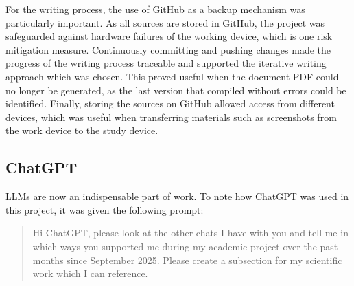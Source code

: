 For the writing process, the use of GitHub as a backup mechanism was particularly important. As all sources are stored in GitHub, the project was safeguarded against hardware failures of the working device, which is one risk mitigation measure. Continuously committing and pushing changes made the progress of the writing process traceable and supported the iterative writing approach which was chosen. This proved useful when the document PDF could no longer be generated, as the last version that compiled without errors could be identified. Finally, storing the sources on GitHub allowed access from different devices, which was useful when transferring materials such as screenshots from the work device to the study device.

\subsection*{ChatGPT}
LLMs are now an indispensable part of work. To note how ChatGPT was used in this project, it was given the following prompt:
\begin{quote}
Hi ChatGPT, please look at the other chats I have with you and tell me in which ways you supported me during my academic project over the past months since September 2025. Please create a subsection for my scientific work which I can reference.
\end{quote}

